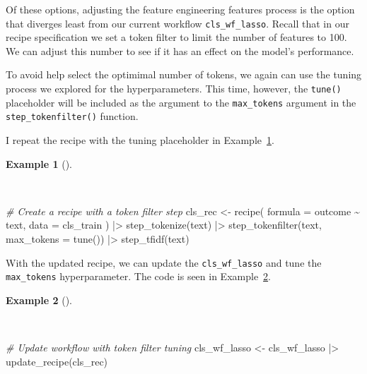 \documentclass[
  letterpaper,
  krantz1]{latex/krantz-mod}
\newenvironment{Shaded}{\begin{snugshade}}{\end{snugshade}}
\newcommand{\AttributeTok}[1]{\textcolor[rgb]{0.00,0.00,0.00}{#1}}
\newcommand{\CommentTok}[1]{\textcolor[rgb]{0.00,0.00,0.00}{\textit{#1}}}
\newcommand{\FunctionTok}[1]{\textcolor[rgb]{0.00,0.00,0.00}{#1}}
\newcommand{\NormalTok}[1]{\textcolor[rgb]{0.00,0.00,0.00}{#1}}
\newcommand{\OtherTok}[1]{\textcolor[rgb]{0.00,0.00,0.00}{#1}}
\newcommand{\SpecialCharTok}[1]{\textcolor[rgb]{0.00,0.00,0.00}{#1}}
\theoremstyle{definition}
\newtheorem{example}{Example}[chapter]
\theoremstyle{definition}
\theoremstyle{remark}
\begin{document}
Of these options, adjusting the feature engineering features process is
the option that diverges least from our current workflow
\texttt{cls\_wf\_lasso}. Recall that in our recipe specification we set
a token filter to limit the number of features to 100. We can adjust
this number to see if it has an effect on the model's performance.

To avoid help select the optimimal number of tokens, we again can use
the tuning process we explored for the hyperparameters. This time,
however, the \texttt{tune()} placeholder will be included as the
argument to the \texttt{max\_tokens} argument in the
\texttt{step\_tokenfilter()} function.

I repeat the recipe with the tuning placeholder in
Example~\ref{exm-predict-class-tune-hyperparameters-tokenfilter}.

\begin{example}[]\protect\hypertarget{exm-predict-class-tune-hyperparameters-tokenfilter}{}\label{exm-predict-class-tune-hyperparameters-tokenfilter}

~

\begin{Shaded}
\begin{Highlighting}[numbers=left,,]
\CommentTok{\# Create a recipe with a token filter step}
\NormalTok{cls\_rec }\OtherTok{\textless{}{-}}
  \FunctionTok{recipe}\NormalTok{(}
    \AttributeTok{formula =}\NormalTok{ outcome }\SpecialCharTok{\textasciitilde{}}\NormalTok{ text,}
    \AttributeTok{data =}\NormalTok{ cls\_train}
\NormalTok{    ) }\SpecialCharTok{|\textgreater{}}
  \FunctionTok{step\_tokenize}\NormalTok{(text) }\SpecialCharTok{|\textgreater{}}
  \FunctionTok{step\_tokenfilter}\NormalTok{(text, }\AttributeTok{max\_tokens =} \FunctionTok{tune}\NormalTok{()) }\SpecialCharTok{|\textgreater{}}
  \FunctionTok{step\_tfidf}\NormalTok{(text)}
\end{Highlighting}
\end{Shaded}

\end{example}

With the updated recipe, we can update the \texttt{cls\_wf\_lasso} and
tune the \texttt{max\_tokens} hyperparameter. The code is seen in
Example~\ref{exm-predict-class-tune-hyperparameters-update-rec}.

\begin{example}[]\protect\hypertarget{exm-predict-class-tune-hyperparameters-update-rec}{}\label{exm-predict-class-tune-hyperparameters-update-rec}

~

\begin{Shaded}
\begin{Highlighting}[numbers=left,,]
\CommentTok{\# Update workflow with token filter tuning}
\NormalTok{cls\_wf\_lasso }\OtherTok{\textless{}{-}}
\NormalTok{  cls\_wf\_lasso }\SpecialCharTok{|\textgreater{}}
  \FunctionTok{update\_recipe}\NormalTok{(cls\_rec)}
\end{Highlighting}
\end{Shaded}

\end{example}
\end{document}
